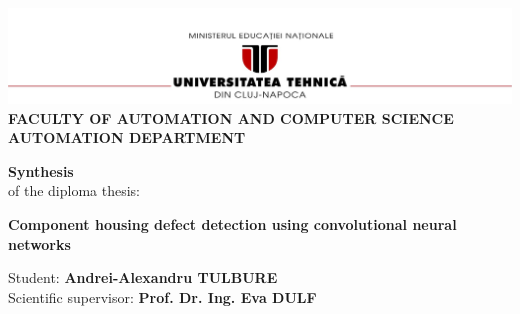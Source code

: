 \documentclass[12pt,a4paper,twoside]{report}
\renewcommand{\thesisauthor}{Andrei-Alexandru TULBURE}    %
\renewcommand{\thesistitle}{Component housing defect detection using convolutional neural networks} %
\newcommand{\department}{FACULTY OF AUTOMATION AND COMPUTER SCIENCE\\
AUTOMATION DEPARTMENT}
\newcommand{\utcnlogo}{\includegraphics[width=15cm]{img/utcn.jpg}}
\begin{document}
\begin{center}
\utcnlogo
\\
{\bf \department}
\begin{center}
\vspace{3mm}
\textbf{Synthesis}\\
of the diploma thesis:
\end{center}

\vspace{1mm}

{\bf \thesistitle}
\vspace{0.5cm}


\end{center}
Student: {\bf \thesisauthor}
\vspace{3mm}\\
\hspace{6cm} Scientific supervisor: \textbf{Prof. Dr. Ing. Eva DULF}
\vspace{1mm}\\
\end{document}
